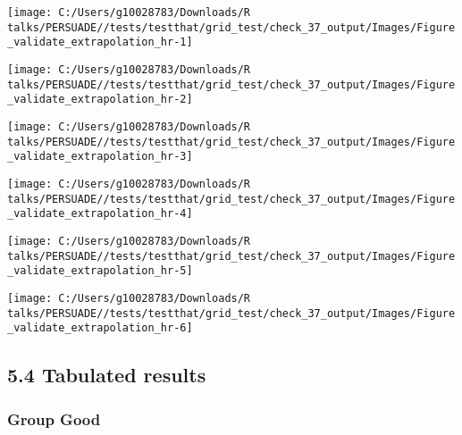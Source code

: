 \documentclass[
]{article}
\begin{document}
\begin{flushleft}\texttt{[image: C:/Users/g10028783/Downloads/R talks/PERSUADE//tests/testthat/grid\_test/check\_37\_output/Images/Figure\_validate\_extrapolation\_hr-1]} \end{flushleft}

\begin{flushleft}\texttt{[image: C:/Users/g10028783/Downloads/R talks/PERSUADE//tests/testthat/grid\_test/check\_37\_output/Images/Figure\_validate\_extrapolation\_hr-2]} \end{flushleft}

\begin{flushleft}\texttt{[image: C:/Users/g10028783/Downloads/R talks/PERSUADE//tests/testthat/grid\_test/check\_37\_output/Images/Figure\_validate\_extrapolation\_hr-3]} \end{flushleft}

\begin{flushleft}\texttt{[image: C:/Users/g10028783/Downloads/R talks/PERSUADE//tests/testthat/grid\_test/check\_37\_output/Images/Figure\_validate\_extrapolation\_hr-4]} \end{flushleft}

\begin{flushleft}\texttt{[image: C:/Users/g10028783/Downloads/R talks/PERSUADE//tests/testthat/grid\_test/check\_37\_output/Images/Figure\_validate\_extrapolation\_hr-5]} \end{flushleft}

\begin{flushleft}\texttt{[image: C:/Users/g10028783/Downloads/R talks/PERSUADE//tests/testthat/grid\_test/check\_37\_output/Images/Figure\_validate\_extrapolation\_hr-6]} \end{flushleft}

\clearpage

\subsection{5.4 Tabulated results}\label{tabulated-results}

\subsubsection{Group Good}\label{group-good}
\end{document}
